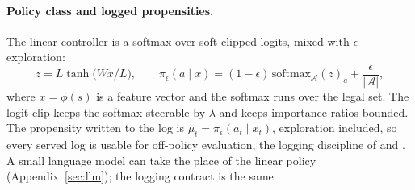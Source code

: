 \documentclass[10pt]{article}
\begin{document}
\paragraph{Policy class and logged propensities.} The linear controller is a softmax over soft-clipped logits, mixed with $\epsilon$-exploration:
\begin{equation}
z=L\tanh\!\big(Wx/L\big),\qquad
\pi_\epsilon(a\mid x)=(1-\epsilon)\,\mathrm{softmax}_{\mathcal{A}}(z)_a+\frac{\epsilon}{|\mathcal{A}|},
\label{eq:policy}
\end{equation}
where $x=\phi(s)$ is a feature vector and the softmax runs over the legal set. The logit clip keeps the softmax steerable by $\lambda$ and keeps importance ratios bounded. The propensity written to the log is $\mu_t=\pi_\epsilon(a_t\mid x_t)$, exploration included, so every served log is usable for off-policy evaluation, the logging discipline of \citet{bottou2013counterfactual} and \citet{li2011unbiased}. A small language model can take the place of the linear policy (Appendix~\ref{sec:llm}); the logging contract is the same.
\end{document}
